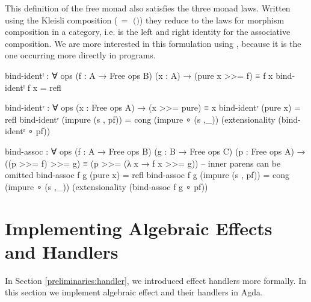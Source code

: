 This definition of the free monad also satisfies the three monad laws.
Written using the Kleisli composition
(\AgdaSpace{}\AgdaFunction{>=>}\AgdaSpace{}$\,=$
\AgdaSpace{}\AgdaSpace{}$($\AgdaFunction{\_}\AgdaFunction{>>=}\AgdaSpace{}$)$)
they reduce to the laws for morphism composition in a category, i.e.
 is the left and right identity for the
associative composition.
We are more interested in this formulation using \AgdaFunction{>>=}, because it
is the one occurring more directly in programs.

\begin{code}[number=bind-ident-left]
bind-identˡ : ∀ {ops} (f : A → Free ops B) (x : A) → (pure x >>= f) ≡ f x
bind-identˡ f x = refl
\end{code}
\begin{code}[number=bind-ident-right]
bind-identʳ : ∀ {ops} (x : Free ops A) → (x >>= pure) ≡ x
bind-identʳ (pure x)           = refl
bind-identʳ (impure (s , pf))  = cong (impure ∘ (s ,_)) (extensionality (bind-identʳ ∘ pf))
\end{code}
\begin{code}[number=bind-assoc]
bind-assoc : ∀ {ops} (f : A → Free ops B) (g : B → Free ops C) (p : Free ops A) →
  ((p >>= f) >>= g) ≡ (p >>= (λ x → f x >>= g)) -- inner parens can be omitted
bind-assoc f g (pure x)           = refl
bind-assoc f g (impure (s , pf))  = cong (impure ∘ (s ,_)) (extensionality (bind-assoc f g ∘ pf))
\end{code}


\section{Implementing Algebraic Effects and Handlers}
\label{first-order:effects-and-handlers}

In Section \ref{preliminaries:handler}, we introduced effect handlers more
formally.
In this section we implement algebraic effect and their handlers in Agda.

